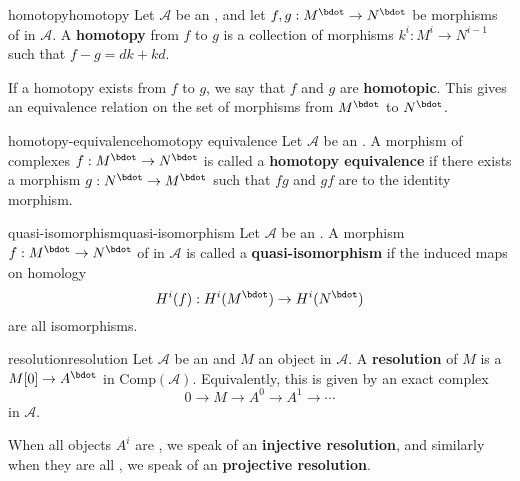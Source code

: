 \begin{topic}{homotopy}{homotopy}
    Let $\mathcal{A}$ be an , and let $f, g : M^\bdot \to N^\bdot$ be morphisms of  in $\mathcal{A}$. A \textbf{homotopy} from $f$ to $g$ is a collection of morphisms $k^i : M^i \to N^{i - 1}$ such that $f - g = dk + kd$.
    
    If a homotopy exists from $f$ to $g$, we say that $f$ and $g$ are \textbf{homotopic}. This gives an equivalence relation on the set of morphisms from $M^\bdot$ to $N^\bdot$.
\end{topic}

\begin{topic}{homotopy-equivalence}{homotopy equivalence}
    Let $\mathcal{A}$ be an . A morphism of complexes $f : M^\bdot \to N^\bdot$ is called a \textbf{homotopy equivalence} if there exists a morphism $g : N^\bdot \to M^\bdot$ such that $fg$ and $gf$ are  to the identity morphism.
\end{topic}

\begin{topic}{quasi-isomorphism}{quasi-isomorphism}
    Let $\mathcal{A}$ be an . A morphism $f : M^\bdot \to N^\bdot$ of  in $\mathcal{A}$ is called a \textbf{quasi-isomorphism} if the induced maps on homology
    \[ H^i(f) : H^i(M^\bdot) \to H^i(N^\bdot) \]
    are all isomorphisms.
\end{topic}

\begin{topic}{resolution}{resolution}
    Let $\mathcal{A}$ be an  and $M$ an object in $\mathcal{A}$. A \textbf{resolution} of $M$ is a  $M[0] \to A^\bdot$ in $\text{Comp}(\mathcal{A})$. Equivalently, this is given by an exact complex
    \[ 0 \to M \to A^0 \to A^1 \to \cdots \]
    in $\mathcal{A}$.
    
    When all objects $A^i$ are , we speak of an \textbf{injective resolution}, and similarly when they are all , we speak of an \textbf{projective resolution}.
\end{topic}

